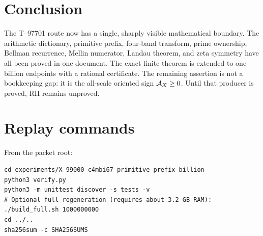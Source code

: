 \section{Conclusion}
The T--97701 route now has a single, sharply visible mathematical boundary.
The arithmetic dictionary, primitive prefix, four-band transform, prime
ownership, Bellman recurrence, Mellin numerator, Landau theorem, and zeta
symmetry have all been proved in one document.  The exact finite theorem is
extended to one billion endpoints with a rational certificate.  The remaining
assertion is not a bookkeeping gap: it is the all-scale oriented sign
$\mathcal A_X\ge0$.  Until that producer is proved, RH remains unproved.

\appendix
\section{Replay commands}
From the packet root:
\begin{lstlisting}
cd experiments/X-99000-c4mbi67-primitive-prefix-billion
python3 verify.py
python3 -m unittest discover -s tests -v
# Optional full regeneration (requires about 3.2 GB RAM):
./build_full.sh 1000000000
cd ../..
sha256sum -c SHA256SUMS
\end{lstlisting}


